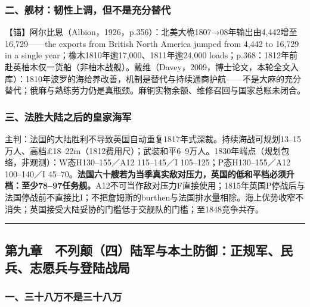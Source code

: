 \documentclass[
  10pt,
  a4paper,
]{article}
\newcommand{\literalquote}{{\addfontfeatures{Mapping=}\char34}}
\begin{document}
\subsubsection{二、舰材：韧性上调，但不是充分替代}\label{ux4e8cux8230ux6750ux97e7ux6027ux4e0aux8c03ux4f46ux4e0dux662fux5145ux5206ux66ffux4ee3}

【锚】阿尔比恩（Albion，1926，p.356）：北美大桅1807→08年输出由4,442增至16,729------\literalquote{}the
exports from British North America jumped from 4,442 to 16,729 in a
single year\literalquote{}；橡木1810年逾17,000、1811年逾24,000
loads；p.368：1812年前赴英柚木仅一货船（非柚木战舰）。戴维（Davey，2009，博士论文，本轮全文入库）：1810年波罗的海给养改善，机制是替代与持续通商护航------不是大麻的充分替代；俄麻与熟练劳力仍是真瓶颈。麻铜实物余额、维修召回与国家总账未闭合。

\subsubsection{三、法胜大陆之后的皇家海军}\label{ux4e09ux6cd5ux80dcux5927ux9646ux4e4bux540eux7684ux7687ux5bb6ux6d77ux519b}

主判：法国的大陆胜利不导致英国自动重复1817年式深裁。持续海战可规划13--15万人、高档£18--22m（1812费用尺）；武装和平6--9万人。1830年端点（规划包络，非观测）：W态H130--155／A12
115--145／I 105--125；P态H130--155／A12 100--140／I
45--70。\textbf{法国六十艘若为当季真实敌对压力，英国的低和平档必须升档：至少78--97任务舰。}A12不可当作敌对压力F直接使用；1815年英国P停战后与法国停战前不直接比I；不把詹姆斯的burthen与法国排水量相除。海上优势收窄不消失；英国接受大陆妥协的门槛低于交舰队的门槛；至1848竞争共存。

\begin{center}\rule{0.5\linewidth}{0.5pt}\end{center}

\subsection{第九章　不列颠（四）陆军与本土防御：正规军、民兵、志愿兵与登陆战局}\label{ux7b2cux4e5dux7ae0-ux4e0dux5217ux98a0ux56dbux9646ux519bux4e0eux672cux571fux9632ux5fa1ux6b63ux89c4ux519bux6c11ux5175ux5fd7ux613fux5175ux4e0eux767bux9646ux6218ux5c40}

\subsubsection{一、三十八万不是三十八万}\label{ux4e00ux4e09ux5341ux516bux4e07ux4e0dux662fux4e09ux5341ux516bux4e07}
\end{document}
